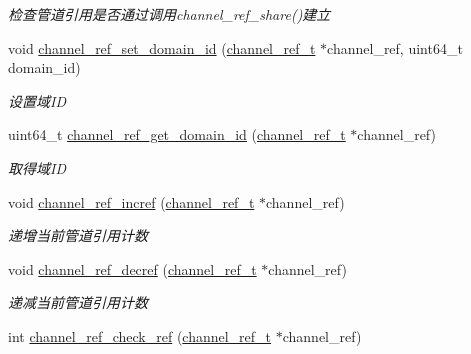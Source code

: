 \begin{DoxyCompactItemize}
\begin{DoxyCompactList}\small\item\em 检查管道引用是否通过调用channel\+\_\+ref\+\_\+share()建立 \end{DoxyCompactList}\item 
void \hyperlink{a00049_a66387736035e1c761a9ceebf3c33d9cf_a66387736035e1c761a9ceebf3c33d9cf}{channel\+\_\+ref\+\_\+set\+\_\+domain\+\_\+id} (\hyperlink{a00051_a151271c9d188ef28d4d24bb81dcc1263_a151271c9d188ef28d4d24bb81dcc1263}{channel\+\_\+ref\+\_\+t} $\ast$channel\+\_\+ref, uint64\+\_\+t domain\+\_\+id)
\begin{DoxyCompactList}\small\item\em 设置域\+I\+D \end{DoxyCompactList}\item 
uint64\+\_\+t \hyperlink{a00049_a8498a205a4580c25c337a33b571396f7_a8498a205a4580c25c337a33b571396f7}{channel\+\_\+ref\+\_\+get\+\_\+domain\+\_\+id} (\hyperlink{a00051_a151271c9d188ef28d4d24bb81dcc1263_a151271c9d188ef28d4d24bb81dcc1263}{channel\+\_\+ref\+\_\+t} $\ast$channel\+\_\+ref)
\begin{DoxyCompactList}\small\item\em 取得域\+I\+D \end{DoxyCompactList}\item 
void \hyperlink{a00049_aef059f673946f97e8b892b600f839af1_aef059f673946f97e8b892b600f839af1}{channel\+\_\+ref\+\_\+incref} (\hyperlink{a00051_a151271c9d188ef28d4d24bb81dcc1263_a151271c9d188ef28d4d24bb81dcc1263}{channel\+\_\+ref\+\_\+t} $\ast$channel\+\_\+ref)
\begin{DoxyCompactList}\small\item\em 递增当前管道引用计数 \end{DoxyCompactList}\item 
void \hyperlink{a00049_a039d289fc9cc8550fece0cd7b154ca7c_a039d289fc9cc8550fece0cd7b154ca7c}{channel\+\_\+ref\+\_\+decref} (\hyperlink{a00051_a151271c9d188ef28d4d24bb81dcc1263_a151271c9d188ef28d4d24bb81dcc1263}{channel\+\_\+ref\+\_\+t} $\ast$channel\+\_\+ref)
\begin{DoxyCompactList}\small\item\em 递减当前管道引用计数 \end{DoxyCompactList}\item 
int \hyperlink{a00049_a57f990b42c6d0e5f12cb8e59c18bdcf3_a57f990b42c6d0e5f12cb8e59c18bdcf3}{channel\+\_\+ref\+\_\+check\+\_\+ref} (\hyperlink{a00051_a151271c9d188ef28d4d24bb81dcc1263_a151271c9d188ef28d4d24bb81dcc1263}{channel\+\_\+ref\+\_\+t} $\ast$channel\+\_\+ref)

\end{DoxyCompactItemize}

